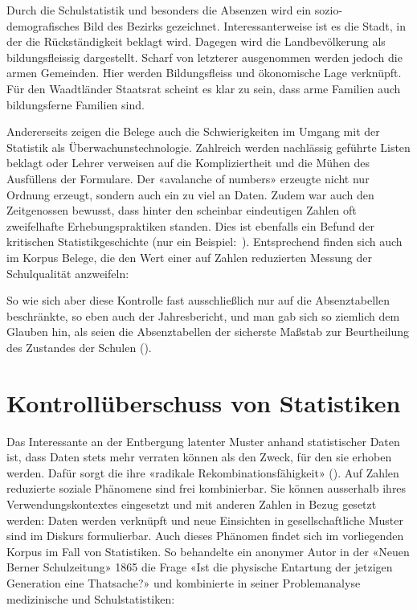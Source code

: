 Durch die Schulstatistik und besonders die Absenzen wird ein sozio-demografisches Bild des Bezirks gezeichnet. Interessanterweise ist es die Stadt, in der die Rückständigkeit beklagt wird. Dagegen wird die Landbevölkerung als bildungsfleissig dargestellt. Scharf von letzterer ausgenommen werden jedoch die armen Gemeinden. Hier werden Bildungsfleiss und ökonomische Lage verknüpft. Für den Waadtländer Staatsrat scheint es klar zu sein, dass arme Familien auch bildungsferne Familien sind.

Andererseits zeigen die Belege auch die Schwierigkeiten im Umgang mit der Statistik als Überwachunstechnologie. Zahlreich werden nachlässig geführte Listen beklagt oder Lehrer verweisen auf die Kompliziertheit und die Mühen des Ausfüllens der Formulare. Der «avalanche of numbers» erzeugte nicht nur Ordnung erzeugt, sondern auch ein zu viel an Daten. Zudem war auch den Zeitgenossen bewusst, dass hinter den scheinbar eindeutigen Zahlen oft zweifelhafte Erhebungspraktiken standen. Dies ist ebenfalls ein Befund der kritischen Statistikgeschichte (nur ein Beispiel:~\cite[88]{bruckweh_menschen_2015}). Entsprechend finden sich auch im Korpus Belege, die den Wert einer auf Zahlen reduzierten Messung der Schulqualität anzweifeln: 

\begin{displayquote}So wie sich aber diese Kontrolle fast ausschließlich nur auf die Absenztabellen beschränkte, so eben auch der Jahresbericht, und man gab sich so ziemlich dem Glauben hin, als seien die Absenztabellen der sicherste Maßstab zur Beurtheilung des Zustandes der Schulen (\cite[272]{noauthor_schulvisitationen_1855}).
\end{displayquote}

\section{Kontrollüberschuss von Statistiken}
Das Interessante an der Entbergung latenter Muster anhand statistischer Daten ist, dass Daten stets mehr verraten können als den Zweck, für den sie erhoben werden. Dafür sorgt die ihre «radikale Rekombinationsfähigkeit» (\cite[128]{nassehi_muster_2019}). Auf Zahlen reduzierte soziale Phänomene sind frei kombinierbar. Sie können ausserhalb ihres Verwendungskontextes eingesetzt und mit anderen Zahlen in Bezug gesetzt werden: Daten werden verknüpft und neue Einsichten in gesellschaftliche Muster sind im Diskurs formulierbar. Auch dieses Phänomen findet sich im vorliegenden Korpus im Fall von Statistiken. So behandelte ein anonymer Autor in der «Neuen Berner Schulzeitung» 1865 die Frage «Ist die physische Entartung der jetzigen Generation eine Thatsache?» und kombinierte in seiner Problemanalyse medizinische und Schulstatistiken: 

